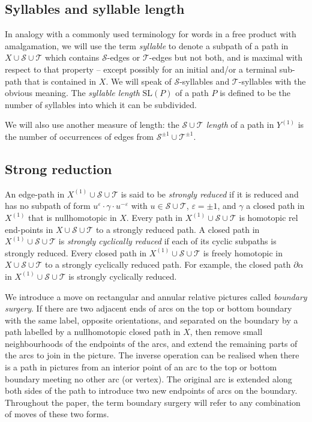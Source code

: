 \documentclass[12pt,a4paper]{amsart}
\def\a{\alpha}
\def\g{\gamma}
\def\cS{\mathcal{S}}
\def\cT{\mathcal{T}}
\begin{document}
 
	\subsection{Syllables and syllable length} 
	In analogy with a commonly used terminology for words in a free product with amalgamation, we will use the term {\em syllable} to denote a subpath of a path in $X\cup\cS\cup\cT$ which contains $\cS$-edges or $\cT$-edges but not both, and is maximal with respect to that property -- except possibly for an initial and/or a terminal sub-path that is  contained in $X$.  
	We will speak of $\cS$-syllables and $\cT$-syllables with the obvious meaning.   The {\em syllable length} $\text{SL}(P)$ of a path $P$ is defined to be the number of syllables into which it can be subdivided.   

\smallskip  
We will also use another measure of length: the {\em $\cS\cup\cT$ length} of a path in $Y^{(1)}$ is the number of occurrences of edges from $\cS^{\pm1}\cup\cT^{\pm1}$. 




\subsection{Strong reduction}	  


An edge-path in $X^{(1)}\cup\cS\cup\cT$ is said to be {\em strongly reduced} if it is reduced and has no subpath of form $u^\varepsilon\cdot\g\cdot u^{-\varepsilon}$ with $u\in\cS\cup\cT$, $\varepsilon=\pm1$, and $\g$ a closed path in $X^{(1)}$ that is nullhomotopic in $X$. Every path in $X^{(1)}\cup\cS\cup\cT$ is homotopic rel end-points in $X\cup\cS\cup\cT$ to a strongly reduced path.  A closed path in $X^{(1)}\cup\cS\cup\cT$ is {\em strongly cyclically reduced} if each of its cyclic subpaths is strongly reduced.  Every closed path in $X^{(1)}\cup\cS\cup\cT$ is freely homotopic in $X\cup\cS\cup\cT$ to a strongly cyclically reduced path.
For example,  the closed path $\partial\a$ in $X^{(1)}\cup\cS\cup\cT$ is strongly cyclically reduced.



\medskip
	
	We introduce a move on rectangular and annular relative pictures called {\em boundary surgery}. 
	If there are two adjacent ends of arcs on the top or bottom boundary with  the same label, opposite orientations, and  separated on the boundary by a path labelled by a nullhomotopic closed path in $X$, 
	then remove small neighbourhoods of the endpoints of the arcs, and extend the remaining parts of the arcs to join in the picture.
	The inverse operation can be realised when there is a path in pictures from an interior point of an arc to the top or bottom boundary meeting no other arc (or vertex). The original arc is extended along both sides of the path to introduce two new
	endpoints of arcs on the boundary.   
    Throughout the paper, the term boundary surgery will refer to any combination of moves of these two forms. 
\end{document}
